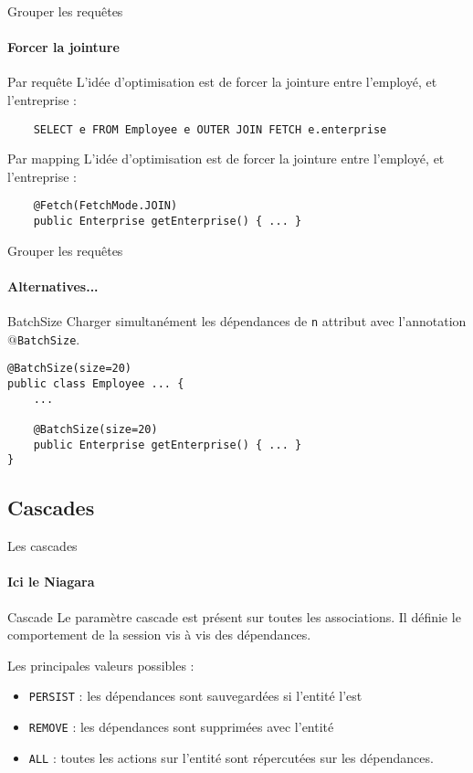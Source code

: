 \documentclass[compress]{beamer}%
\begin{document}
\begin{frame}[fragile]{Grouper les requêtes}
	\framesubtitle{Forcer la jointure}
	
	\begin{block}{Par requête}	
	L'idée d'optimisation est de forcer la jointure entre l'employé, et l'entreprise :\\
	\begin{lstlisting}
	SELECT e FROM Employee e OUTER JOIN FETCH e.enterprise
	\end{lstlisting}
	\end{block}
	
	\pause
	\begin{block}{Par mapping}	
	L'idée d'optimisation est de forcer la jointure entre l'employé, et l'entreprise :\\
	\begin{lstlisting}
	@Fetch(FetchMode.JOIN)
	public Enterprise getEnterprise() { ... }
	\end{lstlisting}
	\end{block}
	

\end{frame}

\begin{frame}[containsverbatim]{Grouper les requêtes}
	\framesubtitle{Alternatives...}
	\begin{block}{BatchSize}
	Charger simultanément les dépendances de \texttt{n} attribut avec l'annotation \texttt{$@$BatchSize}.
	\end{block}
	
	\begin{lstlisting}
@BatchSize(size=20)
public class Employee ... {
	...
	
	@BatchSize(size=20)
	public Enterprise getEnterprise() { ... }
}
	\end{lstlisting}
	
\end{frame}


\subsection{Cascades}
\begin{frame}{Les cascades}
	\framesubtitle{Ici le Niagara}

	\begin{block}{Cascade}
	Le paramètre cascade est présent sur toutes les associations. Il définie le comportement de la session vis à vis des dépendances.
	\end{block}
	
	\pause
	Les principales valeurs possibles :
	\begin{itemize}
	\item \texttt{PERSIST} : les dépendances sont sauvegardées si l'entité l'est
	\item \texttt{REMOVE} : les dépendances sont supprimées avec l'entité
	\item \texttt{ALL} : toutes les actions sur l'entité sont répercutées sur les dépendances.
	\end{itemize}
\end{frame}
\end{document}
